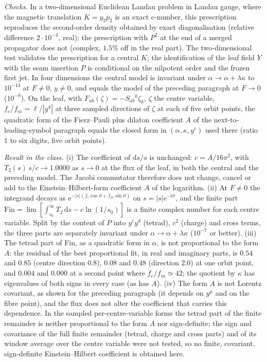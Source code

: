 \emph{Checks.} In a two-dimensional Euclidean Landau problem in Landau gauge, where the magnetic translation \(K=y_2p_2\) is an exact c-number, this prescription reproduces the second-order density obtained by exact diagonalisation (relative difference \(2\cdot10^{-4}\), real); the prescription with \(P^2\) at the end of a merged propagator does not (complex, \(1.5\%\) off in the real part). The two-dimensional test validates the prescription for a central \(K\); the identification of the leaf field \(Y\) with the seam insertion \(P\) is conditional on the nilpotent order and the frozen first jet. In four dimensions the central model is invariant under \(\alpha\to\alpha+\lambda\kappa\) to \(10^{-14}\) at \(F\ne0\), \(y\ne0\), and equals the model of the preceding paragraph at \(F\to0\) (\(10^{-8}\)). On the leaf, with \(F_{ab}(\zeta)=-S_{ab}{}^k\zeta_k\), \(\zeta\) the centre variable, \(f_e/f_m=\ell/|y^4|\) at three sampled directions of \(\zeta\) at each of five orbit points, the quadratic form of the Fierz--Pauli plus dilaton coefficient \(A\) of the next-to-leading-symbol paragraph equals the closed form in \((\alpha,\kappa,y^c)\) used there (ratio \(1\) to six digits, five orbit points).

\emph{Result in the class.} (i) The coefficient of \(\mathrm ds/s\) is unchanged: \(c=A/16\pi^2\), with \(T_2(s)\,s/c\to1.0000\) as \(s\to0\) at the flux of the leaf, in both the central and the preceding model. The Jacobi commutator therefore does not change, cancel or add to the Einstein--Hilbert-form coefficient \(A\) of the logarithm. (ii) At \(F\ne0\) the integrand decays as \(\mathrm e^{-|s|(f_e\cos\vartheta+f_m\sin\vartheta)}\) on \(s=|s|\mathrm e^{-\mathrm i\vartheta}\), and the finite part \(\mathrm{Fin}=\lim[\int_{s_0}^\infty T_2\,\mathrm ds-c\ln(1/s_0)]\) is a finite complex number for each centre variable. Split by the content of \(P\) into \(y^cy^d\) (tetrad), \(c^2\) (charge) and cross terms, the three parts are separately invariant under \(\alpha\to\alpha+\lambda\kappa\) (\(10^{-7}\) or better). (iii) The tetrad part of Fin, as a quadratic form in \(\alpha\), is not proportional to the form \(A\): the residual of the best proportional fit, in real and imaginary parts, is \(0.54\) and \(0.85\) (centre direction \(0.8\)), \(0.08\) and \(0.48\) (direction \(2.0\)) at one orbit point, and \(0.004\) and \(0.000\) at a second point where \(f_e/f_m\simeq42\); the quotient by \(\kappa\) has eigenvalues of both signs in every case (as has \(A\)). (iv) The form \(A\) is not Lorentz covariant, as shown for the preceding paragraph (it depends on \(y^\mu\) and on the fibre point), and the flux does not alter the coefficient that carries this dependence. In the sampled per-centre-variable forms the tetrad part of the finite remainder is neither proportional to the form \(A\) nor sign-definite; the sign and covariance of the full finite remainder (tetrad, charge and cross parts) and of its window average over the centre variable were not tested, so no finite, covariant, sign-definite Einstein--Hilbert coefficient is obtained here.

